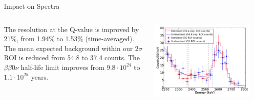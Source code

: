 \documentclass[final]{beamer} %
\begin{document}
\begin{frame}{}
\begin{columns}[t]
\begin{column}{.3\linewidth}
\begin{block}{Impact on Spectra}
      \begin{columns}
        \begin{column}{0.37\textwidth}
          The resolution at the Q-value is improved by 21\%, from 1.94\% to 1.53\% (time-averaged).  The mean expected background within our $2\sigma$ ROI is reduced from 54.8 to 37.4 counts.  The $\beta\beta 0\nu$ half-life limit improves from $9.8 \cdot 10^{24}$ to $1.1 \cdot 10^{25}$ years.
        \end{column}
        \begin{column}{0.63\textwidth}
          \includegraphics[keepaspectratio=true,width=\textwidth]{DenoisedVsUndenoised_TotalPdfsWithData.pdf}
        \end{column}
      \end{columns}
    \end{block}



  \end{column}


  \end{columns}
  \end{frame}
  
\end{document}
